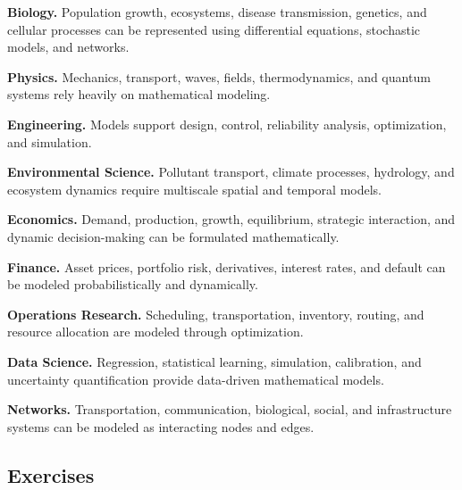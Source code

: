 \begin{applicationbox}

\textbf{Biology.}
Population growth, ecosystems, disease transmission, genetics, and cellular
processes can be represented using differential equations, stochastic
models, and networks.

\medskip

\textbf{Physics.}
Mechanics, transport, waves, fields, thermodynamics, and quantum systems rely
heavily on mathematical modeling.

\medskip

\textbf{Engineering.}
Models support design, control, reliability analysis, optimization, and
simulation.

\medskip

\textbf{Environmental Science.}
Pollutant transport, climate processes, hydrology, and ecosystem dynamics
require multiscale spatial and temporal models.

\medskip

\textbf{Economics.}
Demand, production, growth, equilibrium, strategic interaction, and dynamic
decision-making can be formulated mathematically.

\medskip

\textbf{Finance.}
Asset prices, portfolio risk, derivatives, interest rates, and default can
be modeled probabilistically and dynamically.

\medskip

\textbf{Operations Research.}
Scheduling, transportation, inventory, routing, and resource allocation are
modeled through optimization.

\medskip

\textbf{Data Science.}
Regression, statistical learning, simulation, calibration, and uncertainty
quantification provide data-driven mathematical models.

\medskip

\textbf{Networks.}
Transportation, communication, biological, social, and infrastructure
systems can be modeled as interacting nodes and edges.

\end{applicationbox}

\subsection{Exercises}
\label{subsec:mathematical-modeling-exercises}

